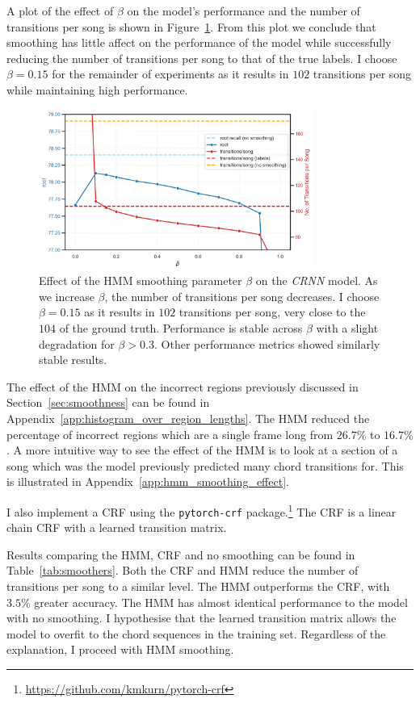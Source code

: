 A plot of the effect of $\beta$ on the model's performance and the number of transitions per song is shown in Figure~\ref{fig:hmm_beta_search}. From this plot we conclude that smoothing has little affect on the performance of the model while successfully reducing the number of transitions per song to that of the true labels. I choose $\beta = 0.15$ for the remainder of experiments as it results in $102$ transitions per song while maintaining high performance. 

\begin{figure}[H]
    \centering
    \includegraphics[width=0.8\textwidth]{figures/hmm_beta_vs_root_transitions.png}
    \caption{Effect of the HMM smoothing parameter $\beta$ on the \emph{CRNN} model. As we increase $\beta$, the number of transitions per song decreases. I choose $\beta = 0.15$ as it results in $102$ transitions per song, very close to the $104$ of the ground truth. Performance is stable across $\beta$ with a slight degradation for $\beta > 0.3$. Other performance metrics showed similarly stable results. }\label{fig:hmm_beta_search}
\end{figure}

The effect of the HMM on the incorrect regions previously discussed in Section~\ref{sec:smoothness} can be found in Appendix~\ref{app:histogram_over_region_lengths}. The HMM reduced the percentage of incorrect regions which are a single frame long from $26.7\%$ to $16.7\%$. A more intuitive way to see the effect of the HMM is to look at a section of a song which was the model previously predicted many chord transitions for. This is illustrated in Appendix~\ref{app:hmm_smoothing_effect}.

I also implement a CRF using the \texttt{pytorch-crf} package.\footnote{\url{https://github.com/kmkurn/pytorch-crf}} The CRF is a linear chain CRF with a learned transition matrix.

Results comparing the HMM, CRF and no smoothing can be found in Table~\ref{tab:smoothers}. Both the CRF and HMM reduce the number of transitions per song to a similar level. The HMM outperforms the CRF, with $3.5\%$ greater accuracy. The HMM has almost identical performance to the model with no smoothing. I hypothesise that the learned transition matrix allows the model to overfit to the chord sequences in the training set. Regardless of the explanation, I proceed with HMM smoothing.

